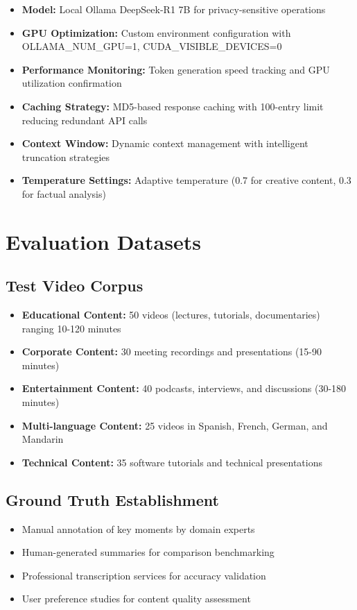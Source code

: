 \documentclass{bscs}
\begin{document}
\begin{itemize}
\item \textbf{Model:} Local Ollama DeepSeek-R1 7B for privacy-sensitive operations
\item \textbf{GPU Optimization:} Custom environment configuration with OLLAMA\_NUM\_GPU=1, CUDA\_VISIBLE\_DEVICES=0
\item \textbf{Performance Monitoring:} Token generation speed tracking and GPU utilization confirmation
\item \textbf{Caching Strategy:} MD5-based response caching with 100-entry limit reducing redundant API calls
\item \textbf{Context Window:} Dynamic context management with intelligent truncation strategies
\item \textbf{Temperature Settings:} Adaptive temperature (0.7 for creative content, 0.3 for factual analysis)
\end{itemize}

\section{Evaluation Datasets}

\subsection{Test Video Corpus}

\begin{itemize}
\item \textbf{Educational Content:} 50 videos (lectures, tutorials, documentaries) ranging 10-120 minutes
\item \textbf{Corporate Content:} 30 meeting recordings and presentations (15-90 minutes)
\item \textbf{Entertainment Content:} 40 podcasts, interviews, and discussions (30-180 minutes)
\item \textbf{Multi-language Content:} 25 videos in Spanish, French, German, and Mandarin
\item \textbf{Technical Content:} 35 software tutorials and technical presentations
\end{itemize}

\subsection{Ground Truth Establishment}

\begin{itemize}
\item Manual annotation of key moments by domain experts
\item Human-generated summaries for comparison benchmarking
\item Professional transcription services for accuracy validation
\item User preference studies for content quality assessment
\end{itemize}
\end{document}
